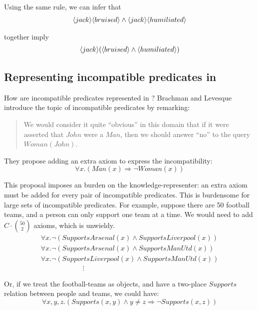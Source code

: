 \NI Using the same rule, we can infer that
\begin{eqnarray*}
   \langle jack \rangle \langle bruised \rangle \land \langle jack \rangle \langle humiliated \rangle \end{eqnarray*}

\NI together imply
\begin{eqnarray*}
\langle jack \rangle (\langle bruised \rangle \land \langle humiliated \rangle )
\end{eqnarray*}
 
\subsection{Representing incompatible predicates in \fol}\label{incompatiblepredicatesinfol}

\NI How are incompatible predicates represented in 
\fol{}?  Brachman and Levesque \cite{brachman} introduce the
topic of incompatible predicates by remarking:
\begin{quote}
   We would consider it quite ``obvious'' in this domain that if it
   were asserted that $John$ were a $Man$, then we should answer
   ``no'' to the query $Woman(John)$.
\end{quote}

\NI They propose adding an extra axiom to express the incompatibility:
\[
   \forall x. ( Man(x) \Rightarrow \neg Woman(x) )
\]  
 
\NI This proposal imposes an burden on the knowledge-representer: an
extra axiom must be added for every pair of incompatible predicates.
This is burdensome for large sets of incompatible predicates.  For
example, suppose there are 50 football teams, and a person can only
support one team at a time.  We would need to add $C \cdot {50 \choose
  2}$ axioms, which is unwieldy.
\[
\begin{array}{l}
  \forall x.  \neg (SupportsArsenal(x) \land SupportsLiverpool(x))  \\
  \forall x.  \neg (SupportsArsenal(x) \land SupportsManUtd(x))  \\
  \forall x.  \neg (SupportsLiverpool(x) \land SupportsManUtd(x))  \\
  \qquad \qquad \qquad \vdots
\end{array}
\]

\NI Or, if we treat the football-teams as objects, and have a
two-place $Supports$ relation between people and teams, we could have:
\[
   \forall x, y, z. (Supports(x,y) \land y \neq z \Rightarrow \neg Supports(x,z))
\]   

